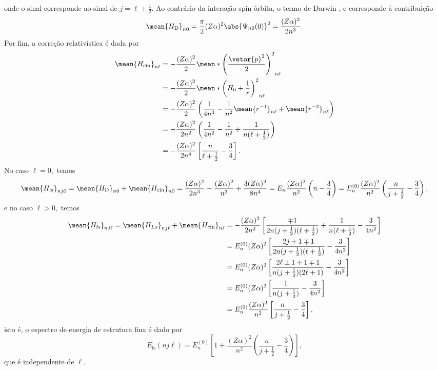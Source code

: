 onde o sinal corresponde ao sinal de \(j = \ell \pm \frac12.\) Ao contrário da interação spin-órbita, o termo de Darwin \todo[só é não nulo para \(\ell = 0\)], e corresponde à contribuição
\begin{equation*}
   \mean{H_\mathrm{D}}_{n0} = \frac{\pi}{2}(Z \alpha)^2 \abs{\Psi_{n0}(0)}^2 = \frac{(Z \alpha)^2}{2n^3}.
\end{equation*}
Por fim, a correção relativística é dada por
\begin{align*}
   \mean{H_\mathrm{cin}}_{n\ell} &= -\frac{(Z\alpha)^2}{2}\mean*{\left(\frac{\vetor{p}^2}{2}\right)^2}_{n\ell}\\
                                 &= - \frac{(Z \alpha)^2}{2} \mean*{\left(H_0 + \frac{1}{r}\right)^2}_{n\ell}\\
                                 &= -\frac{(Z \alpha)^2}{2} \left(\frac{1}{4n^4} - \frac{1}{n^2}\mean{r^{-1}}_{n\ell} + \mean{r^{-2}}_{n\ell}\right)\\
                                 &= - \frac{(Z \alpha)^2}{2n^2} \left(\frac{1}{4n^2} - \frac{1}{n^2} + \frac{1}{n ( \ell + \frac12)}\right)\\
                                 &= -\frac{(Z \alpha)^2}{2n^4}\left[\frac{n}{\ell + \frac12} - \frac34\right].
\end{align*}
No caso \(\ell = 0,\) temos
\begin{equation*}
   \mean{H_\mathrm{fs}}_{nj0} = \mean{H_\mathrm{D}}_{n 0} + \mean{H_\mathrm{cin}}_{n 0} = \frac{(Z \alpha)^2}{2n^3} - \frac{(Z \alpha)^2}{n^3} + \frac{3(Z \alpha)^2}{8n^4} = E_n\frac{(Z \alpha)^2}{n^2}\left(n - \frac34\right) = E_n^{(0)} \frac{(Z \alpha)^2}{n^2} \left(\frac{n}{j + \frac12} - \frac34\right),
\end{equation*}
e no caso \(\ell > 0,\) temos
\begin{align*}
   \mean{H_\mathrm{fs}}_{nj \ell} = \mean{H_{Ls}}_{nj \ell} + \mean{H_\mathrm{cin}}_{n\ell} 
   &= -\frac{(Z \alpha)^2}{2n^2}\left[\frac{\mp1}{2n (j+\frac12) (\ell + \frac12)} + \frac{1}{n(\ell + \frac12)} - \frac3{4n^2}\right] \\
   &= E_n^{(0)} (Z \alpha)^2\left[\frac{2j + 1 \mp 1}{2n(j + \frac12)(\ell + \frac12)} - \frac3{4n^2}\right]\\
   &= E_n^{(0)} (Z \alpha)^2\left[\frac{2\ell \pm 1 + 1 \mp 1}{n(j + \frac12)(2\ell + 1)} - \frac3{4n^2}\right]\\
   &= E_n^{(0)} (Z \alpha)^2\left[\frac{1}{n(j + \frac12)} - \frac3{4n^2}\right]\\
   &= E_n^{(0)} \frac{(Z \alpha)^2}{n^2}\left[\frac{n}{j + \frac12} - \frac34\right],
\end{align*}
isto é, o espectro de energia de estrutura fina é dado por
\begin{equation*}
   E_\mathrm{fs}(nj\ell) = E_n^{(0)}\left[1 + \frac{(Z\alpha)^2}{n^2}\left(\frac{n}{j + \frac12} - \frac34\right)\right],
\end{equation*}
que é independente de \(\ell.\)
